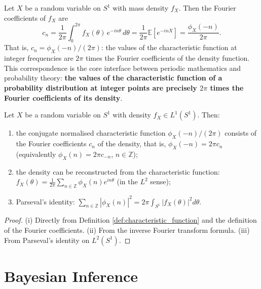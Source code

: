 \begin{remark}\label{ch14_periodic_series_interface}
Let $X$ be a random variable on $S^1$ with mass density $f_X$. Then the Fourier coefficients of $f_X$ are
\[
c_n = \frac{1}{2\pi} \int_0^{2\pi} f_X(\theta)\, e^{-in\theta}\, d\theta = \frac{1}{2\pi}\mathbb{E}[e^{-inX}] = \frac{\phi_X(-n)}{2\pi}.
\]
That is, $c_n = \phi_X(-n)/(2\pi)$: the values of the characteristic function at integer frequencies are $2\pi$ times the Fourier coefficients of the density function. This correspondence is the core interface between periodic mathematics and probability theory: \textbf{the values of the characteristic function of a probability distribution at integer points are precisely $2\pi$ times the Fourier coefficients of its density}.
\end{remark}

\begin{proposition}\label{prop:S1_char_fourier}
Let $X$ be a random variable on $S^1$ with density $f_X \in L^1(S^1)$. Then:
\begin{enumerate}[label=(\roman*)]
    \item the conjugate normalised characteristic function $\phi_X(-n)/(2\pi)$ consists of the Fourier coefficients $c_n$ of the density, that is, $\phi_X(-n) = 2\pi c_n$ (equivalently $\phi_X(n) = 2\pi c_{-n}$, $n \in \mathbb{Z}$);
    \item the density can be reconstructed from the characteristic function: $f_X(\theta) = \frac{1}{2\pi}\sum_{n \in \mathbb{Z}} \phi_X(n) e^{in\theta}$ (in the $L^2$ sense);
    \item Parseval's identity: $\sum_{n \in \mathbb{Z}} |\phi_X(n)|^2 = 2\pi \int_{S^1} |f_X(\theta)|^2 d\theta$.
\end{enumerate}
\end{proposition}

\begin{proof}
(i) Directly from Definition \ref{def:characteristic_function} and the definition of the Fourier coefficients. (ii) From the inverse Fourier transform formula. (iii) From Parseval's identity on $L^2(S^1)$.
\end{proof}

\section{Bayesian Inference}\label{sec:bayesian_inference}


